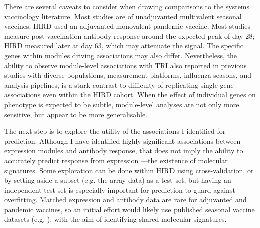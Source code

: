 There are several caveats to consider when drawing comparisons to the systems vaccinology literature.
Most studies are of unadjuvanted multivalent seasonal vaccines; \gls{HIRD} used an adjuvanted monovalent pandemic vaccine.
Most studies measure post-vaccination antibody response around the expected peak of day 28; \gls{HIRD} measured later at day 63, which may attenuate the signal.
The specific genes within modules driving associations may also differ.
Nevertheless, the ability to observe module-level associations with \gls{TRI} also reported in previous studies with diverse populations, measurement platforms, influenza seasons, and analysis pipelines,
is a stark contrast to difficulty of replicating single-gene associations even within the \gls{HIRD} cohort.
When the effect of individual genes on phenotype is expected to be subtle,
module-level analyses are not only more sensitive, but appear to be more generalisable.

The next step is to explore the utility of the associations I identified for prediction.
Although I have identified highly significant associations between expression modules and antibody response,
that does not imply the ability to accurately predict response from expression \autocite{tsang2014GlobalAnalysesHuman}---the existence of molecular signatures.
Some exploration can be done within \gls{HIRD} using cross-validation, or by setting aside a subset (e.g. the array data) as a test set,
but having an independent test set is especially important for prediction to guard against overfitting.
Matched expression and antibody data are rare for adjuvanted and pandemic vaccines,
so an initial effort would likely use published seasonal vaccine datasets (e.g. \autocite{nakaya2015SystemsAnalysisImmunity,hipc-chisignaturesprojectteam2017MulticohortAnalysisReveals}),
with the aim of identifying shared molecular signatures.

